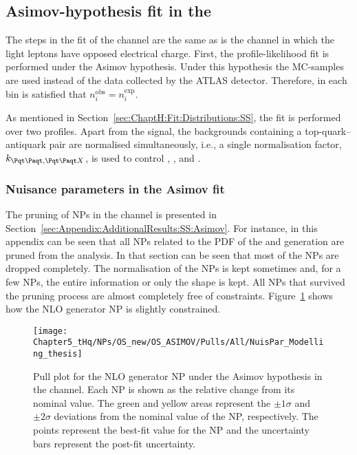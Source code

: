 \FloatBarrier %

\subsection{Asimov-hypothesis fit in the \dilepSStau}
\label{sec:ChaptH:Fit:ASIMOV:SS}
The steps in the fit of the \dilepSStau channel are the same as is the channel in which the light leptons have
opposed electrical charge. First, the profile-likelihood fit is performed under the Asimov hypothesis.
Under this hypothesis the MC-samples are used instead of the data collected by the ATLAS detector.
Therefore, in each bin is satisfied that $n_{i}^{\text{obs}}=n_{i}^{\text{exp}}$.

As mentioned in Section~\ref{sec:ChaptH:Fit:Distributions:SS}, the \dilepSStau fit is performed 
over two profiles. Apart from the \tHq signal, the backgrounds containing a top-quark--antiquark pair
are normalised simultaneously, i.e., a single normalisation factor, $k_{\ttbar, \ttX}$, is used to control \ttbar, \ttW, \ttH and \ttZ.




\subsubsection{Nuisance parameters in the \dilepSStau Asimov fit}
\label{sec:ChaptH:Fit:ASIMOV:SS:NPs}
The pruning of NPs in the \dilepSStau channel is presented in Section~\ref{sec:Appendix:AdditionalResults:SS:Asimov}.
 For instance, in this appendix can be seen
that all NPs related to the PDF of the \ttbar and \ttW generation are pruned from the analysis.
In that section can be seen that most of the NPs are dropped completely. The normalisation of the NPs is kept sometimes and, for a few NPs, the entire information or only the shape is kept.
All NPs that survived the pruning process are almost completely free of constraints. 
Figure~\ref{fig:ChaptH:Asimov:SS:ConstrainedNPs} shows how the \ttbar NLO generator NP
is slightly constrained.

\begin{figure}[h] 
\centering
  \texttt{[image: Chapter5\_tHq/NPs/OS\_new/OS\_ASIMOV/Pulls/All/NuisPar\_Modelling\_thesis]}
\caption{Pull plot for the \ttbar NLO generator NP under the Asimov hypothesis in the \dilepSStau channel.
Each NP is shown as the relative change from its nominal value.
   The green and yellow areas represent the $\pm1\sigma$ and $\pm2\sigma$ deviations from the nominal value of the NP, respectively. 
   The points represent the best-fit value for the NP and the uncertainty bars represent the post-fit uncertainty.} 
\label{fig:ChaptH:Asimov:SS:ConstrainedNPs}
\end{figure}



